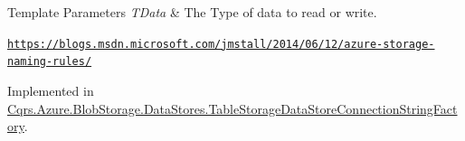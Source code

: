 \begin{DoxyTemplParams}{Template Parameters}
{\em T\+Data} & The Type of data to read or write.\\
\hline
\end{DoxyTemplParams}


\href{https://blogs.msdn.microsoft.com/jmstall/2014/06/12/azure-storage-naming-rules/}{\tt https\+://blogs.\+msdn.\+microsoft.\+com/jmstall/2014/06/12/azure-\/storage-\/naming-\/rules/}

Implemented in \hyperlink{classCqrs_1_1Azure_1_1BlobStorage_1_1DataStores_1_1TableStorageDataStoreConnectionStringFactory_ac992c8d5387ddf5965cc661f1b85a721_ac992c8d5387ddf5965cc661f1b85a721}{Cqrs.\+Azure.\+Blob\+Storage.\+Data\+Stores.\+Table\+Storage\+Data\+Store\+Connection\+String\+Factory}.

